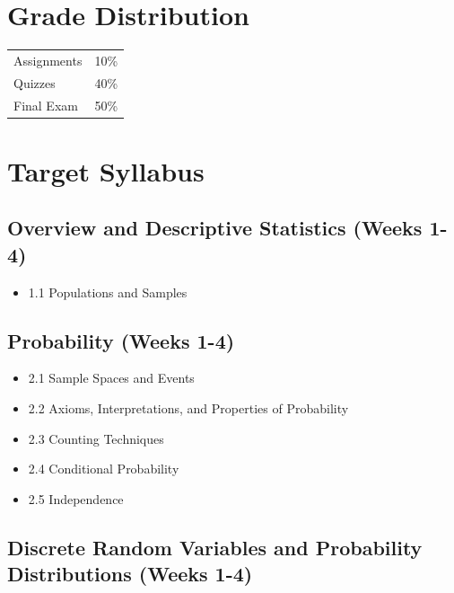 \documentclass[]{book}
\providecommand{\tightlist}{%
  \setlength{\itemsep}{0pt}\setlength{\parskip}{0pt}}
\theoremstyle{definition}
\theoremstyle{definition}
\theoremstyle{definition}
\theoremstyle{remark}
\begin{document}
\section*{Grade Distribution}\label{grade-distribution}

\begin{tabular}{l|l}
\hline
 & \\
\hline
Assignments & 10\%\\
\hline
Quizzes & 40\%\\
\hline
Final Exam & 50\%\\
\hline
\end{tabular}

\section*{Target Syllabus}\label{target-syllabus}

\subsection*{Overview and Descriptive Statistics (Weeks
1-4)}\label{overview-and-descriptive-statistics-weeks-1-4}

\begin{itemize}
\tightlist
\item
  1.1 Populations and Samples
\end{itemize}

\subsection*{Probability (Weeks 1-4)}\label{probability-weeks-1-4}

\begin{itemize}
\tightlist
\item
  2.1 Sample Spaces and Events
\item
  2.2 Axioms, Interpretations, and Properties of Probability
\item
  2.3 Counting Techniques
\item
  2.4 Conditional Probability
\item
  2.5 Independence
\end{itemize}

\subsection*{Discrete Random Variables and Probability Distributions
(Weeks
1-4)}\label{discrete-random-variables-and-probability-distributions-weeks-1-4}
\end{document}
